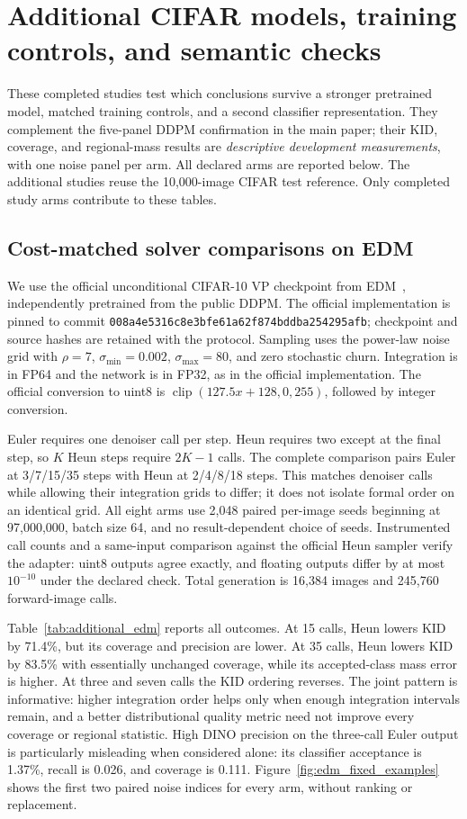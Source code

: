 \section{Additional CIFAR models, training controls, and semantic checks}
\label{sec:supp_additional_cifar}

These completed studies test which conclusions survive a stronger pretrained
model, matched training controls, and a second classifier representation.
They complement the five-panel DDPM confirmation in the main paper; their KID, coverage, and regional-mass results are
\emph{descriptive development measurements}, with one noise panel per arm.
All declared arms are reported below. The additional studies reuse the
10,000-image CIFAR test reference. Only completed study arms contribute to these tables.

\subsection{Cost-matched solver comparisons on EDM}
We use the official unconditional CIFAR-10 VP checkpoint from
EDM~\cite{karras2022edm}, independently pretrained from the public DDPM.
The official implementation is pinned to commit
\texttt{008a4e5316c8e3bfe61a\allowbreak{}62f874bddba254295afb}; checkpoint and source
hashes are retained with the protocol. Sampling uses the power-law noise
grid with $\rho=7$, $\sigma_{\min}=0.002$, $\sigma_{\max}=80$, and
zero stochastic churn. Integration is in FP64 and the network is in FP32,
as in the official implementation. The official conversion to uint8 is
$\operatorname{clip}(127.5x+128,0,255)$, followed by integer conversion.

Euler requires one denoiser call per step. Heun requires two except at the
final step, so $K$ Heun steps require $2K-1$ calls. The complete comparison
pairs Euler at 3/7/15/35 steps with Heun at 2/4/8/18 steps.
This matches denoiser calls while allowing their integration grids to differ;
it does not isolate formal order on an identical grid. All eight arms use
2,048 paired per-image seeds beginning at 97,000,000, batch size 64, and
no result-dependent choice of seeds. Instrumented call counts and a
same-input comparison against the official Heun sampler verify the adapter:
uint8 outputs agree exactly, and floating outputs differ by at most
$10^{-10}$ under the declared check. Total generation is 16,384 images and
245,760 forward-image calls.

Table~\ref{tab:additional_edm} reports all outcomes.
At 15 calls, Heun lowers KID by 71.4\%, but its coverage and precision
are lower. At 35 calls, Heun lowers KID by 83.5\% with essentially unchanged
coverage, while its accepted-class mass error is higher. At three and
seven calls the KID ordering reverses. The joint pattern is informative:
higher integration order helps only when enough integration intervals
remain, and a better distributional quality metric need not improve every
coverage or regional statistic. High DINO precision on the three-call
Euler output is particularly misleading when considered alone: its
classifier acceptance is 1.37\%, recall is 0.026, and coverage is 0.111.
Figure~\ref{fig:edm_fixed_examples} shows the first two paired noise indices
for every arm, without ranking or replacement.

